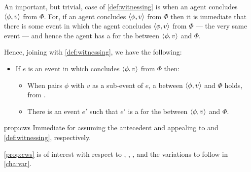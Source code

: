 \begin{note}
  An important, but trivial, case of \autoref{def:witnessing} is when an agent concludes \(\langle \phi, v \rangle\) from \(\Phi\).
  For, if an agent concludes \(\langle \phi, v \rangle\) from \(\Phi\) then it is immediate that there is some event in which the agent concludes \(\langle \phi, v \rangle\) from \(\Phi\) --- the very same event --- and hence the agent has a \wit{} for the \ros{} between \(\langle \phi, v \rangle\) and \(\Phi\).

  Hence, joining \supportI{} with \autoref{def:witnessing}, we have the following:

  \begin{proposition}
    \label{prop:cws}
    \begin{itemize}
    \item
      If \(e\) is an event in which \vAgent{} concludes \(\langle \phi, v \rangle\) from \(\Phi\) then:
      \begin{itemize}
      \item
        When \vAgent{} pairs \(\phi\) with \(v\) as a sub-event of \(e\), a \ros{} between \(\langle \phi, v \rangle\) and \(\Phi\) holds, from .
      \item
        There is an event \(e'\) such that \(e'\) is a \wit{} for the \ros{} between \(\langle \phi, v \rangle\) and \(\Phi\).
      \end{itemize}
    \end{itemize}
    \vspace{-\baselineskip}
  \end{proposition}

  \begin{argument}{prop:cws}
    Immediate for assuming the antecedent and appealing to \supportI{} and \autoref{def:witnessing}, respectively.
  \end{argument}

  \autoref{prop:cws} is of interest with respect to \qWhy{}, \qHow{}, \issueInclusion{}, and the variations to follow in \autoref{cha:var}.


\end{note}
